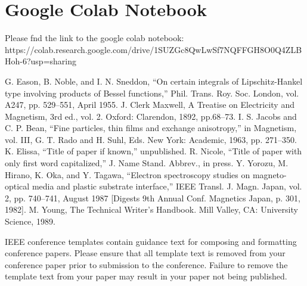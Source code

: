 \documentclass[11pt]{article}
\begin{document}
\newpage



\section*{Google Colab Notebook}
Please fnd the link to the google colab notebook: \\
https://colab.research.google.com/drive/1SUZGc8QwLwSf7NQFFGH8O0Q4ZLBHoh-6?usp=sharing



\begin{thebibliography}{00}
 G. Eason, B. Noble, and I. N. Sneddon, ``On certain integrals of Lipschitz-Hankel type involving products of Bessel functions,'' Phil. Trans. Roy. Soc. London, vol. A247, pp. 529--551, April 1955.
 J. Clerk Maxwell, A Treatise on Electricity and Magnetism, 3rd ed., vol. 2. Oxford: Clarendon, 1892, pp.68--73.
 I. S. Jacobs and C. P. Bean, ``Fine particles, thin films and exchange anisotropy,'' in Magnetism, vol. III, G. T. Rado and H. Suhl, Eds. New York: Academic, 1963, pp. 271--350.
 K. Elissa, ``Title of paper if known,'' unpublished.
 R. Nicole, ``Title of paper with only first word capitalized,'' J. Name Stand. Abbrev., in press.
 Y. Yorozu, M. Hirano, K. Oka, and Y. Tagawa, ``Electron spectroscopy studies on magneto-optical media and plastic substrate interface,'' IEEE Transl. J. Magn. Japan, vol. 2, pp. 740--741, August 1987 [Digests 9th Annual Conf. Magnetics Japan, p. 301, 1982].
 M. Young, The Technical Writer's Handbook. Mill Valley, CA: University Science, 1989.
\end{thebibliography}

\vspace{12pt}
\color{red}
IEEE conference templates contain guidance text for composing and formatting conference papers. Please ensure that all template text is removed from your conference paper prior to submission to the conference. Failure to remove the template text from your paper may result in your paper not being published.
\end{document}

